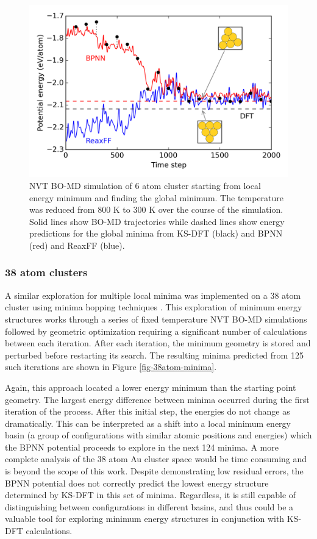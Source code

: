\documentclass[12pt]{cmuthesis}
\begin{document}
\begin{figure}[h]
\centering
\includegraphics[width=5in]{./images/fig-6atom-md.png}
\caption{\label{fig-6atom-md}
NVT BO-MD simulation of 6 atom cluster starting from local energy minimum and finding the global minimum. The temperature was reduced from 800 K to 300 K over the course of the simulation. Solid lines show BO-MD trajectories while dashed lines show energy predictions for the global minima from KS-DFT (black) and BPNN (red) and ReaxFF (blue).}
\end{figure}

\subsubsection{38 atom clusters}
\label{sec:org10d91a9}
A similar exploration for multiple local minima was implemented on a 38 atom cluster using minima hopping techniques \cite{goedecker-2004-minim}. This exploration of minimum energy structures works through a series of fixed temperature NVT BO-MD simulations followed by geometric optimization requiring a significant number of calculations between each iteration. After each iteration, the minimum geometry is stored and perturbed before restarting its search. The resulting minima predicted from 125 such iterations are shown in Figure \ref{fig-38atom-minima}.

Again, this approach located a lower energy minimum than the starting point geometry. The largest energy difference between minima occurred during the first iteration of the process. After this initial step, the energies do not change as dramatically. This can be interpreted as a shift into a local minimum energy basin (a group of configurations with similar atomic positions and energies) which the BPNN potential proceeds to explore in the next 124 minima. A more complete analysis of the 38 atom Au cluster space would be time consuming and is beyond the scope of this work. Despite demonstrating low residual errors, the BPNN potential does not correctly predict the lowest energy structure determined by KS-DFT in this set of minima. Regardless, it is still capable of distinguishing between configurations in different basins, and thus could be a valuable tool for exploring minimum energy structures in conjunction with KS-DFT calculations.
\end{document}
